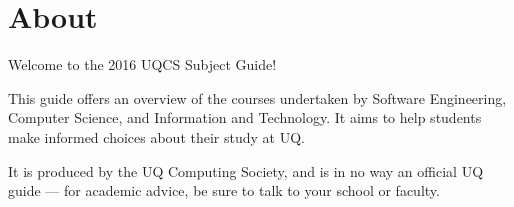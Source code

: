 \section{About}
\hypertarget{core:about}{}
Welcome to the 2016 UQCS Subject Guide!

This guide offers an overview of the courses undertaken by Software Engineering, Computer Science, and Information and Technology.
It aims to help students make informed choices about their study at UQ.

It is produced by the UQ Computing Society, and is in no way an official UQ guide --- for academic advice, be sure to talk to your school or faculty.

